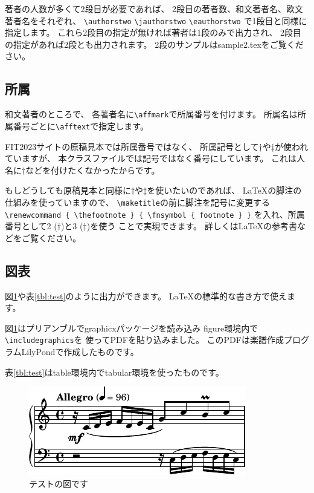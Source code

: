 \documentclass{FITpaper}
\begin{document}
著者の人数が多くて2段目が必要であれば、
2段目の著者数、和文著者名、欧文著者名をそれぞれ、
\texttt{\textbackslash authorstwo}
\texttt{\textbackslash jauthorstwo}
\texttt{\textbackslash eauthorstwo}
で1段目と同様に指定します。
これら2段目の指定が無ければ著者は1段のみで出力され、
2段目の指定があれば2段とも出力されます。
2段のサンプルはsample2.texをご覧ください。

\subsection{所属}

和文著者のところで、
各著者名に\texttt{\textbackslash af\mbox{}fmark}で所属番号を付けます。
所属名は所属番号ごとに\texttt{\textbackslash af\mbox{}ftext}で指定します。

FIT2023サイトの原稿見本では所属番号ではなく、
所属記号として$\dag$や$\ddag$が使われていますが、
本クラスファイルでは記号ではなく番号にしています。
これは人名に$\dag$などを付けたくなかったからです。

もしどうしても原稿見本と同様に$\dag$や$\ddag$を使いたいのであれば、
\LaTeX の脚注の仕組みを使っていますので、
\texttt{\textbackslash maketitle}の前に脚注を記号に変更する
\texttt{\textbackslash renewcommand \{
  \textbackslash thefootnote \} \{
  \textbackslash fnsymbol \{ footnote \} \}}
を入れ、所属番号として2 ($\dag$)と3 ($\ddag$)を使う
ことで実現できます。
詳しくは\LaTeX の参考書などをご覧ください。

\subsection{図表}

図\ref{fig:test}や表\ref{tbl:test}のように出力ができます。
\LaTeX の標準的な書き方で使えます。

図\ref{fig:test}はプリアンブルでgraphicxパッケージを読み込み
figure環境内で\texttt{\textbackslash includegraphics}を
使ってPDFを貼り込みました。
このPDFは楽譜作成プログラムLilyPond\cite{lilypond}で作成したものです。

表\ref{tbl:test}はtable環境内でtabular環境を使ったものです。

\begin{figure}[htbp]
  \centering
  \includegraphics{invention1}
  \caption{テストの図です}
  \label{fig:test}
\end{figure}
\end{document}
